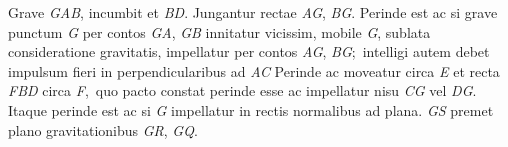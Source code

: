 \pstart
Grave \textit{GAB},
incumbit
et \textit{BD}. Jungantur rectae \textit{AG}, \textit{BG}. Perinde est ac si grave punctum \textit{G}
per contos \textit{GA}, \textit{GB} innitatur 
vicissim, mobile \textit{G}, sublata consideratione gravitatis, impellatur 
per contos \textit{AG}, \textit{BG}\lbrack;\rbrack\
intelligi autem debet impulsum fieri in perpendicularibus ad \textit{AC}\bracks{,} 
\edtext{\bracks{\textit{BD}}.}{\lemma{}\Bfootnote{\textit{BD} \textit{erg.~Hrsg.}}}
Perinde ac 
moveatur circa \textit{E} et recta \textit{FBD} circa \textit{F}\lbrack,\rbrack\
quo pacto constat perinde esse ac 
impellatur nisu \textit{CG} vel \textit{DG}. %
\pend
\pstart
Itaque perinde est ac si \textit{G} impellatur in rectis normalibus ad plana.
\pend
\pstart
{}
\textit{GS} premet plano gravitationibus \textit{GR}, \textit{GQ}.
\pend
